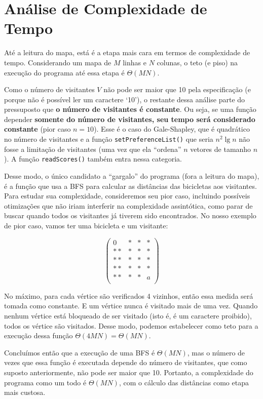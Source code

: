 \documentclass{article}
\def\code#1{\texttt{#1}}
\begin{document}
\section{Análise de Complexidade de Tempo}

Até a leitura do mapa, está é a etapa mais cara em termos de complexidade de tempo. Considerando um mapa de \( M \) linhas e \( N\) colunas, o teto (e piso) na execução do programa até essa etapa é \( \Theta(MN) \).

Como o número de visitantes \( V \) não pode ser maior que 10 pela especificação (e porque não é possível ler um caractere `10'), o restante dessa análise parte do pressuposto que \textbf{o número de visitantes é constante}. Ou seja, se uma função depender \textbf{somente do número de visitantes, seu tempo será considerado constante} (pior caso \( n = 10 \)). Esse é o caso do Gale-Shapley, que é quadrático no número de visitantes e a função \code{setPreferenceList()} que seria \( n^2 \lg n \) não fosse a limitação de visitantes (uma vez que ela ``ordena'' \( n \) vetores de tamanho \( n \)). A função \code{readScores()} também entra nessa categoria.

Desse modo, o único candidato a ``gargalo'' do programa (fora a leitura do mapa), é a função que usa a BFS para calcular as distâncias das bicicletas aos visitantes. Para estudar sua complexidade, consideremos seu pior caso, incluindo possíveis otimizações que não iriam interferir na complexidade assintótica, como parar de buscar quando todos os visitantes já tiverem sido encontrados. No nosso exemplo de pior caso, vamos ter uma bicicleta e um visitante:

\begin{equation}
	\left(\begin{array}{cccc}
		0  & * & * & * \\
		** & * & * & * \\
		** & * & * & * \\
		** & * & * & * \\
		** & * & * & a \\
	\end{array}\right)
\end{equation}

No máximo, para cada vértice são verificados 4 vizinhos, então essa medida será tomada como constante. E um vértice nunca é visitado mais de uma vez. Quando nenhum vértice está bloqueado de ser visitado (isto é, é um caractere proibido), todos os vértice são visitados. Desse modo, podemos estabelecer como teto para a execução dessa função \( \Theta(4MN) = \Theta(MN) \).

Concluímos então que a execução de uma BFS é \( \Theta(MN) \), mas o número de vezes que essa função é executada depende do número de visitantes, que como suposto anteriormente, não pode ser maior que 10. Portanto, a complexidade do programa como um todo é \( \Theta(MN) \), com o cálculo das distâncias como etapa mais custosa.
\end{document}
